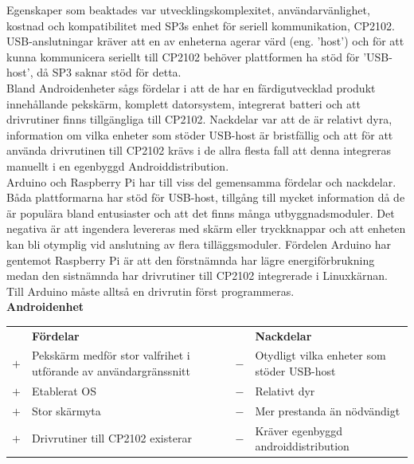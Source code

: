 \documentclass{article}
\begin{document}
            \noindent Egenskaper som beaktades var utvecklingskomplexitet, användarvänlighet, kostnad och kompatibilitet med SP3s enhet för seriell kommunikation, CP2102. USB-anslutningar kräver att en av enheterna agerar värd (eng. 'host') och för att kunna kommunicera seriellt till CP2102 behöver plattformen ha stöd för 'USB-host', då SP3 saknar stöd för detta. \\
            
            \noindent Bland Androidenheter sågs fördelar i att de har en färdigutvecklad produkt innehållande pekskärm, komplett datorsystem, integrerat batteri och att drivrutiner finns tillgängliga till CP2102. Nackdelar var att de är relativt dyra, information om vilka enheter som stöder USB-host är bristfällig och att för att använda drivrutinen till CP2102 krävs i de allra flesta fall att denna integreras manuellt i en egenbyggd Androiddistribution. \\
            
            \noindent Arduino och Raspberry Pi har till viss del gemensamma fördelar och nackdelar. Båda plattformarna har stöd för USB-host, tillgång till mycket information då de är populära bland entusiaster och att det finns många utbyggnadsmoduler. Det negativa är att ingendera levereras med skärm eller tryckknappar och att enheten kan bli otymplig vid anslutning av flera tilläggsmoduler. Fördelen Arduino har gentemot Raspberry Pi är att den förstnämnda har lägre energiförbrukning medan den sistnämnda har drivrutiner till CP2102 integrerade i Linuxkärnan. Till Arduino måste alltså en drivrutin först programmeras. \\


            \noindent\textsf{\textbf{Androidenhet}}\\
            \begin{tabularx}{\textwidth}{@{}cXcX}
                & \textbf{Fördelar}     & & \textbf{Nackdelar} \\
                $+$ & Pekskärm medför stor valfrihet i utförande av användargränssnitt     &                            $-$ & Otydligt vilka enheter som
                                                  stöder USB-host \\
                $+$ &  Etablerat OS     &   $-$ & Relativt dyr \\
                $+$ &  Stor skärmyta    &   $-$ & Mer prestanda än nödvändigt \\
                $+$ &  Drivrutiner till CP2102 existerar &
                                            $-$ & Kräver egenbyggd androiddistribution \\
            \end{tabularx}\\
\end{document}
